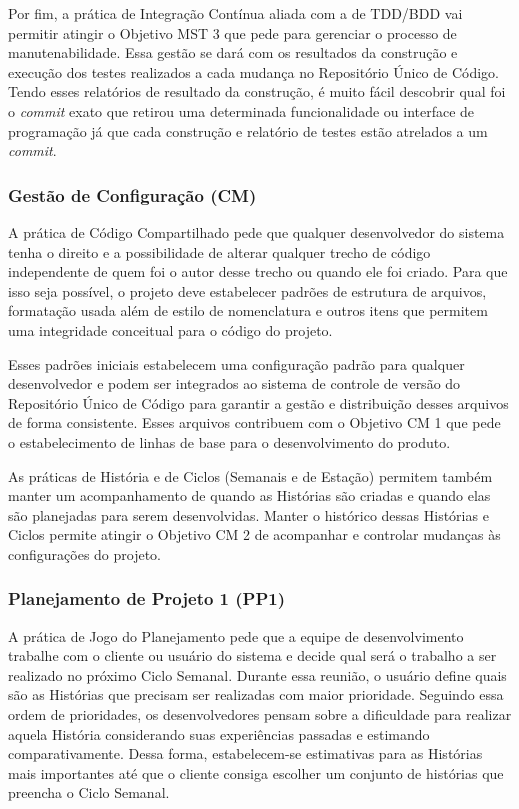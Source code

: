 Por fim, a prática de Integração Contínua aliada com a de TDD/BDD vai
permitir atingir o Objetivo MST 3 que pede para gerenciar o processo
de manutenabilidade. Essa gestão se dará com os resultados da
construção e execução dos testes realizados a cada mudança no
Repositório Único de Código. Tendo esses relatórios de resultado da
construção, é muito fácil descobrir qual foi o \textit{commit} exato
que retirou uma determinada funcionalidade ou interface de programação
já que cada construção e relatório de testes estão atrelados a um
\textit{commit}.

\subsubsection{Gestão de Configuração (CM)}
\label{sec:+cm}

A prática de Código Compartilhado pede que qualquer desenvolvedor do
sistema tenha o direito e a possibilidade de alterar qualquer trecho
de código independente de quem foi o autor desse trecho ou quando ele
foi criado. Para que isso seja possível, o projeto deve estabelecer
padrões de estrutura de arquivos, formatação usada além de estilo de
nomenclatura e outros itens que permitem uma integridade conceitual
para o código do projeto.

Esses padrões iniciais estabelecem uma configuração padrão para
qualquer desenvolvedor e podem ser integrados ao sistema de controle
de versão do Repositório Único de Código para garantir a gestão e
distribuição desses arquivos de forma consistente. Esses arquivos
contribuem com o Objetivo CM 1 que pede o estabelecimento de linhas de
base para o desenvolvimento do produto.

As práticas de História e de Ciclos (Semanais e de Estação) permitem
também manter um acompanhamento de quando as Histórias são criadas e
quando elas são planejadas para serem desenvolvidas. Manter o
histórico dessas Histórias e Ciclos permite atingir o Objetivo CM 2 de
acompanhar e controlar mudanças às configurações do projeto.

\subsubsection{Planejamento de Projeto 1 (PP1)}
\label{sec:+pp1}

A prática de Jogo do Planejamento pede que a equipe de desenvolvimento
trabalhe com o cliente ou usuário do sistema e decide qual será o
trabalho a ser realizado no próximo Ciclo Semanal. Durante essa
reunião, o usuário define quais são as Histórias que precisam ser
realizadas com maior prioridade. Seguindo essa ordem de prioridades,
os desenvolvedores pensam sobre a dificuldade para realizar aquela
História considerando suas experiências passadas e estimando
comparativamente. Dessa forma, estabelecem-se estimativas para as
Histórias mais importantes até que o cliente consiga escolher um
conjunto de histórias que preencha o Ciclo Semanal.

